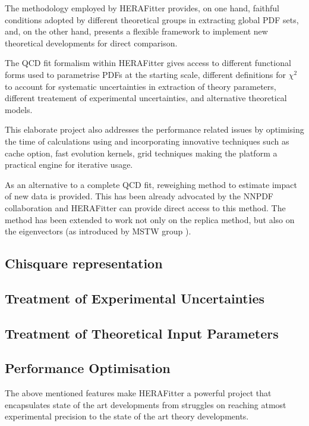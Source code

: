 
The methodology employed by HERAFitter provides,  
 on one hand, faithful conditions adopted by different theoretical 
groups in extracting global PDF sets, and, on the other hand,  presents
a flexible framework to implement new theoretical developments for 
direct comparison.

The QCD fit formalism within HERAFitter gives access to different functional 
forms used to parametrise PDFs at the starting scale, different definitions for $\chi^2$ to account for systematic uncertainties in extraction of theory parameters, different treatement of experimental uncertainties, and alternative theoretical models. 

This elaborate project also addresses the performance related issues by optimising the time of calculations using and incorporating innovative techniques such as cache option, fast evolution kernels, grid techniques making the platform a practical engine for iterative usage.

As an alternative to a complete QCD fit, reweighing method to estimate impact of new data is provided. This has been already advocated by the NNPDF collaboration \cite{PDFreplicareweighing} and HERAFitter can provide direct access to this method. The method has been extended to work not only on the replica method, but also on the eigenvectors (as introduced by MSTW group \cite{PDFeigreweighing}).





\subsection{Chisquare representation}


\subsection{Treatment of Experimental Uncertainties}


\subsection{Treatment of Theoretical Input Parameters}

\subsection{Performance Optimisation}

The above mentioned features make HERAFitter a powerful project that encapsulates state of the art developments from struggles on reaching atmost experimental precision to the state of the art theory developments. 



